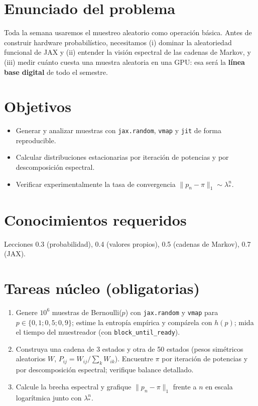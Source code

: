 \documentclass[11pt,a4paper]{article}
\begin{document}

\section*{Enunciado del problema}
Toda la semana usaremos el muestreo aleatorio como operación básica. Antes de construir hardware probabilístico,
necesitamos (i) dominar la aleatoriedad funcional de JAX y (ii) entender la visión espectral de las cadenas de
Markov, y (iii) medir cuánto cuesta una muestra aleatoria en una GPU: esa será la \textbf{línea base digital} de
todo el semestre.

\section*{Objetivos}
\begin{itemize}[nosep]
\item Generar y analizar muestras con \texttt{jax.random}, \texttt{vmap} y \texttt{jit} de forma reproducible.
\item Calcular distribuciones estacionarias por iteración de potencias y por descomposición espectral.
\item Verificar experimentalmente la tasa de convergencia $\|p_n-\pi\|_1\sim\lambda_*^n$.
\end{itemize}

\section*{Conocimientos requeridos}
Lecciones 0.3 (probabilidad), 0.4 (valores propios), 0.5 (cadenas de Markov), 0.7 (JAX).

\section*{Tareas núcleo (obligatorias)}
\begin{enumerate}
\item Genere $10^6$ muestras de Bernoulli($p$) con \texttt{jax.random} y \texttt{vmap} para $p\in\{0{,}1;0{,}5;0{,}9\}$; estime la entropía empírica y compárela con $h(p)$; mida el tiempo del muestreador (con \texttt{block\_until\_ready}).
\item Construya una cadena de 3 estados y otra de 50 estados (pesos simétricos aleatorios $W$, $P_{ij}=W_{ij}/\sum_kW_{ik}$). Encuentre $\pi$ por iteración de potencias y por descomposición espectral; verifique balance detallado.
\item Calcule la brecha espectral y grafique $\|p_n-\pi\|_1$ frente a $n$ en escala logarítmica junto con $\lambda_*^n$.
\end{enumerate}
\end{document}
